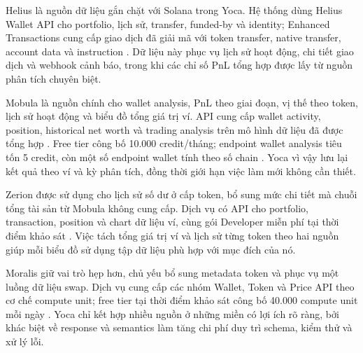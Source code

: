 Helius là nguồn dữ liệu gắn chặt với Solana trong Yoca. Hệ thống dùng Helius Wallet API cho portfolio, lịch sử, transfer, funded-by và identity; Enhanced Transactions cung cấp giao dịch đã giải mã với token transfer, native transfer, account data và instruction \cite{helius-enhanced-transactions}. Dữ liệu này phục vụ lịch sử hoạt động, chi tiết giao dịch và webhook cảnh báo, trong khi các chỉ số PnL tổng hợp được lấy từ nguồn phân tích chuyên biệt.

Mobula là nguồn chính cho wallet analysis, PnL theo giai đoạn, vị thế theo token, lịch sử hoạt động và biểu đồ tổng giá trị ví. API cung cấp wallet activity, position, historical net worth và trading analysis trên mô hình dữ liệu đã được tổng hợp \cite{mobula-data-api}. Free tier công bố 10.000 credit/tháng; endpoint wallet analysis tiêu tốn 5 credit, còn một số endpoint wallet tính theo số chain \cite{mobula-pricing}. Yoca vì vậy lưu lại kết quả theo ví và kỳ phân tích, đồng thời giới hạn việc làm mới không cần thiết.

Zerion được sử dụng cho lịch sử số dư ở cấp token, bổ sung mức chi tiết mà chuỗi tổng tài sản từ Mobula không cung cấp. Dịch vụ có API cho portfolio, transaction, position và chart dữ liệu ví, cùng gói Developer miễn phí tại thời điểm khảo sát \cite{zerion-api}. Việc tách tổng giá trị ví và lịch sử từng token theo hai nguồn giúp mỗi biểu đồ sử dụng tập dữ liệu phù hợp với mục đích của nó.

Moralis giữ vai trò hẹp hơn, chủ yếu bổ sung metadata token và phục vụ một luồng dữ liệu swap. Dịch vụ cung cấp các nhóm Wallet, Token và Price API theo cơ chế compute unit; free tier tại thời điểm khảo sát công bố 40.000 compute unit mỗi ngày \cite{moralis-pricing}. Yoca chỉ kết hợp nhiều nguồn ở những miền có lợi ích rõ ràng, bởi khác biệt về response và semantics làm tăng chi phí duy trì schema, kiểm thử và xử lý lỗi.

